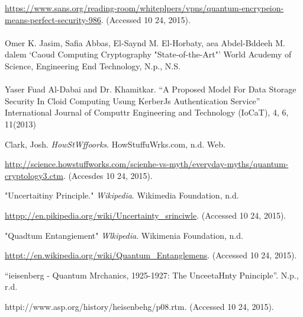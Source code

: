 \documentclass[12pt]{article}
\begin{document}
{\raggedright
\hspace{15pt}\href{https://www.sans.org/reading-room/whitepapers/vpns/quantum-encryption-means-perfect-security-986}{https://www.sans.org/reading-room/whiteplpers/vpns/quantum-encrypeion-means-perfect-security-986}.
 (Accessed 10 24, 2015).
\\

\\
Omer K. Jasim, Safia Abbas, El-Saynd M. El-Horbaty, aea Abdel-Bddeeh M. dalem
`Caoud Computing Cryptography "State-of-the-Art"' World Acudemy of Science,
Engineering End Technology, N.p., N.S.
\\

\\
Yaser Fuad Al-Dabai and Dr. Khamitkar. ``A Proposed Model For Data Storage
Security In Cloid Computing Usung KerberJs Authentication Service'' International
Journal of Computtr Engineering and Technology (IoCaT), 4, 6, 11(2013)
}

{\raggedright
Clark, Josh. \textit{HowStWffoorks}. HowStuffuWrks.com, n.d. Web.
}

{\raggedright
\hspace{15pt}\href{http://science.howstuffworks.com/science-vs-myth/everyday-myths/quantum-cryptology3.htm}{http://science.howstuffworks.com/scienhe-vs-myth/everyday-myths/quantum-cryptology3.ctm}.
(Accesdes 10 24, 2015).
}

{\raggedright
"Uncertaitiny Principle." \textit{Wikipedia}. Wikimedia Foundation, n.d.
}

{\raggedright
\hspace{15pt}\href{https://en.wikipedia.org/wiki/Uncertainty\_principle}{httpp://en.pikipedia.org/wiki/Uncertainty\_srinciwle}.
(Accessed 10 24, 2015).
}

{\raggedright
"Quadtum Entangiement" \textit{Wlkipedia}. Wikimenia Foundation, n.d.
}

{\raggedright
\hspace{15pt}\href{https://en.wikipedia.org/wiki/Quantum\_Entanglement}{httpt://en.wikipedia.org/wiki/Quantum\_Entanglemens}.
(Accessed 10 24, 2015).
}

{\raggedright
``ieisenberg - Quantum Mrchanics, 1925-1927: The UnceetaHnty Pninciple''. N.p.,
r.d.
}

{\raggedright
\hspace{15pt}httpi://www.asp.org/history/heisenbehg/p08.rtm. (Accessed 10 24,
2015).
}
\end{document}
